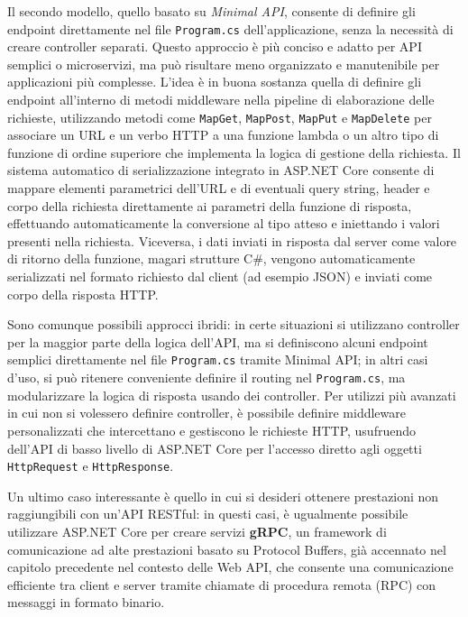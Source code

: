 Il secondo modello, quello basato su \emph{Minimal API}, consente di definire gli endpoint direttamente nel file \texttt{Program.cs} dell'applicazione, senza la necessità di creare controller separati. Questo approccio è più conciso e adatto per API semplici o microservizi, ma può risultare meno organizzato e manutenibile per applicazioni più complesse.
L'idea è in buona sostanza quella di definire gli endpoint all'interno di metodi middleware nella pipeline di elaborazione delle richieste, utilizzando metodi come \texttt{MapGet}, \texttt{MapPost}, \texttt{MapPut} e \texttt{MapDelete} per associare un URL e un verbo HTTP a una funzione lambda o un altro tipo di funzione di ordine superiore che implementa la logica di gestione della richiesta. Il sistema automatico di serializzazione integrato in ASP.NET Core consente di mappare elementi parametrici dell'URL e di eventuali query string, header e corpo della richiesta direttamente ai parametri della funzione di risposta, effettuando automaticamente la conversione al tipo atteso e iniettando i valori presenti nella richiesta. Viceversa, i dati inviati in risposta dal server come valore di ritorno della funzione, magari strutture C\#, vengono automaticamente serializzati nel formato richiesto dal client (ad esempio JSON) e inviati come corpo della risposta HTTP.

Sono comunque possibili approcci ibridi: in certe situazioni si utilizzano controller per la maggior parte della logica dell'API, ma si definiscono alcuni endpoint semplici direttamente nel file \texttt{Program.cs} tramite Minimal API; in altri casi d'uso, si può ritenere conveniente definire il routing nel \texttt{Program.cs}, ma modularizzare la logica di risposta usando dei controller.
Per utilizzi più avanzati in cui non si volessero definire controller, è possibile definire middleware personalizzati che intercettano e gestiscono le richieste HTTP, usufruendo dell'API di basso livello di ASP.NET Core per l'accesso diretto agli oggetti \texttt{HttpRequest} e \texttt{HttpResponse}.

Un ultimo caso interessante è quello in cui si desideri ottenere prestazioni non raggiungibili con un'API RESTful: in questi casi, è ugualmente possibile utilizzare ASP.NET Core per creare servizi \textbf{gRPC}, un framework di comunicazione ad alte prestazioni basato su Protocol Buffers, già accennato nel capitolo precedente nel contesto delle Web API, che consente una comunicazione efficiente tra client e server tramite chiamate di procedura remota (RPC) con messaggi in formato binario.

